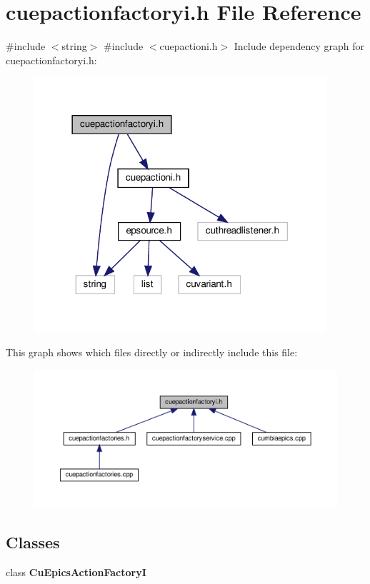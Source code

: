 \section{cuepactionfactoryi.\+h File Reference}
\label{cuepactionfactoryi_8h}
{\ttfamily \#include $<$string$>$}\newline
{\ttfamily \#include $<$cuepactioni.\+h$>$}\newline
Include dependency graph for cuepactionfactoryi.\+h\+:\nopagebreak
\begin{figure}[H]
\begin{center}
\leavevmode
\includegraphics[width=306pt]{cuepactionfactoryi_8h__incl}
\end{center}
\end{figure}
This graph shows which files directly or indirectly include this file\+:\nopagebreak
\begin{figure}[H]
\begin{center}
\leavevmode
\includegraphics[width=350pt]{cuepactionfactoryi_8h__dep__incl}
\end{center}
\end{figure}
\subsection*{Classes}
\begin{DoxyCompactItemize}
\item 
class \textbf{ Cu\+Epics\+Action\+FactoryI}
\end{DoxyCompactItemize}
